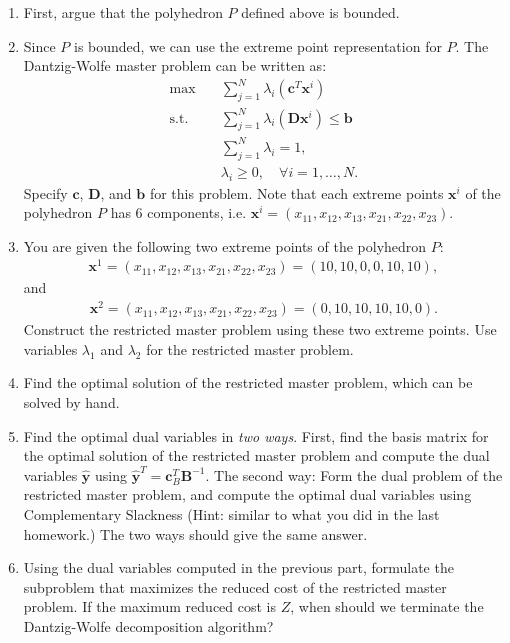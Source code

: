 \documentclass[11pt]{article}
\newcommand{\mb}[1]{\ensuremath{\boldsymbol{#1}}}
\begin{document}
\begin{enumerate}
\item First, argue that the polyhedron $P$ defined above is bounded.

\item Since $P$ is bounded, we can use the extreme point representation for $P$. The Dantzig-Wolfe master problem can be written as:
\begin{align*}
\max \quad & \sum_{j=1}^N \lambda_i \left(\mb{c}^T\mb{x}^i\right) \\
\text{s.t.}\quad & \sum_{j=1}^N \lambda_i \left(\mb{D}\mb{x}^i\right) \leq \mb{b} \\
                       & \sum_{j=1}^N \lambda_i = 1, \\
                       & \lambda_i \geq 0, \quad\forall i = 1, \dots, N.
\end{align*}
Specify $\mb{c}$, $\mb{D}$, and $\mb{b}$ for this problem. Note that each extreme points $\mb{x}^i$ of the polyhedron $P$ has 6 components, i.e. $\mb{x}^i = (x_{11},x_{12},x_{13},x_{21},x_{22},x_{23})$. 
\item You are given the following two extreme points of the polyhedron $P$: 
\begin{align*}
\mb{x}^1 = (x_{11},x_{12},x_{13},x_{21},x_{22},x_{23}) = (10,10,0,0,10,10),
\end{align*}
and 
\begin{align*}
\mb{x}^2 = (x_{11},x_{12},x_{13},x_{21},x_{22},x_{23}) = (0,10,10,10,10,0).
\end{align*}
Construct the restricted master problem using these two extreme points. Use variables $\lambda_1$ and $\lambda_2$ for the restricted master problem.

\item Find the optimal solution of the restricted master problem, which can be solved by hand.

\item Find the optimal dual variables in \textit{two ways}. First, find the basis matrix for the optimal solution of the restricted master problem and compute the dual variables $\hat{\mb{y}}$ using $\hat{\mb{y}}^T=\mb{c}_B^T\mb{B}^{-1}$. The second way: Form the dual problem of the restricted master problem, and compute the optimal dual variables using Complementary Slackness (Hint: similar to what you did in the last homework.) The two ways should give the same answer.

\item Using the dual variables computed in the previous part, formulate the subproblem that maximizes the reduced cost of the restricted master problem. If the maximum reduced cost is $Z$, when should we terminate the Dantzig-Wolfe decomposition algorithm? 


\end{enumerate}
\end{document}
